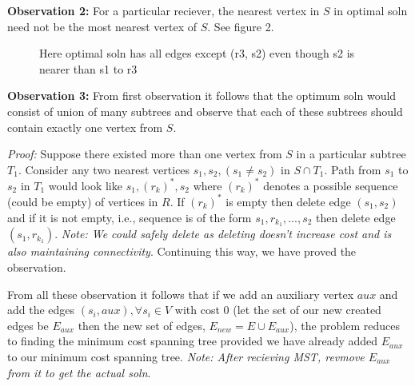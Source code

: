 \documentclass[12pt,3p]{elsarticle}
\begin{document}
\textbf{Observation 2: }For a particular reciever, the nearest vertex in $S$ in optimal soln need not be the most nearest vertex of $S$. See figure 2.

\begin{figure}[!h]
    \centering
    \caption{Here optimal soln has all edges except (r3, s2) even though s2 is nearer than s1 to r3}
\end{figure}

\textbf{Observation 3: }From first observation it follows that the optimum soln would consist of union of many subtrees and observe that each of these subtrees should contain exactly one vertex from $S$. 

\textit{Proof: }Suppose there existed more than one vertex from $S$ in a particular subtree $T_1$. Consider any two nearest vertices $s_1, s_2, (s_1 \neq s_2)$ in $S \cap T_1$. Path from $s_1$ to $s_2$ in $T_1$ would look like $s_1, (r_k)^*, s_2$ where $(r_k)^*$ denotes a possible sequence (could be empty) of vertices in $R$. If $(r_k)^*$ is empty then delete edge $(s_1, s_2)$ and if it is not empty, i.e., sequence is of the form $s_1, r_{k_1}, ..., s_2$ then delete edge $(s_1, r_{k_1})$. \textit{Note: We could safely delete as deleting doesn't increase cost and is also maintaining connectivity}. Continuing this way, we have proved the observation.

From all these observation it follows that if we add an auxiliary vertex $aux$ and add the edges $(s_i, aux), \forall s_i \in V$ with cost 0 (let the set of our new created edges be $E_{aux}$ then the new set of edges, $E_{new} = E \cup E_{aux}$), the problem reduces to finding the minimum cost spanning tree provided we have already added $E_{aux}$ to our minimum cost spanning tree. \textit{Note: After recieving MST, revmove $E_{aux}$ from it to get the actual soln}.
\end{document}
